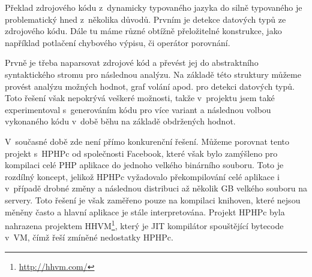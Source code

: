 \documentclass[czech]{ExcelAtFIT}
\begin{document}
		Překlad zdrojového kódu z~dynamicky typovaného jazyka do silně typovaného je problematický hned z~několika důvodů. Prvním je detekce datových typů ze zdrojového kódu. Dále tu máme různé obtížně přeložitelné konstrukce, jako například potlačení chybového výpisu, či operátor porovnání.


		Prvně je třeba naparsovat zdrojové kód a převést jej do abstraktního syntaktického stromu pro následnou analýzu. Na základě této struktury můžeme provést analýzu možných hodnot, graf volání apod. pro detekci datových typů. Toto řešení však nepokrývá veškeré možnosti, takže v~projektu jsem také experimentoval s~generováním kódu pro více variant a následnou volbou vykonaného kódu v~době běhu na základě obdržených hodnot.







		V~současné době zde není přímo konkurenční řešení. Můžeme porovnat tento projekt s~HPHPc od společnosti Facebook, které však bylo zamýšleno pro kompilaci celé PHP aplikace do jednoho velkého binárního souboru. Toto je rozdílný koncept, jelikož HPHPc vyžadovalo překompilování celé aplikace i v~případě drobné změny a následnou distribuci až několik GB velkého souboru na servery. Toto řešení je však zaměřeno pouze na kompilaci knihoven, které nejsou měněny často a hlavní aplikace je stále interpretována. Projekt HPHPc byla nahrazena projektem HHVM\footnote{\url{http://hhvm.com/}}, který je JIT kompilátor spouštějící bytecode v~VM, čímž řeší zmíněné nedostatky HPHPc.
\end{document}
